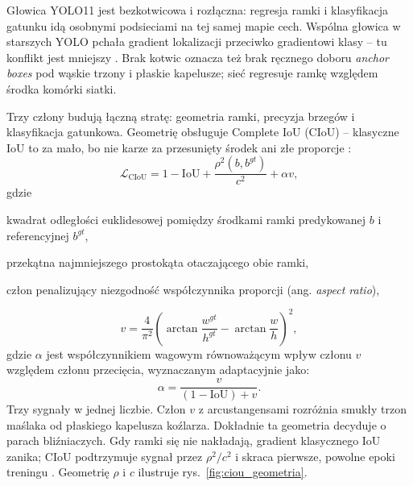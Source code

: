 Głowica YOLO11 jest bezkotwicowa i rozłączna: regresja ramki i klasyfikacja gatunku idą osobnymi podsieciami na tej samej mapie cech. Wspólna głowica w starszych YOLO pchała gradient lokalizacji przeciwko gradientowi klasy – tu konflikt jest mniejszy \cite{ultralytics2024yolo11}. Brak kotwic oznacza też brak ręcznego doboru \textit{anchor boxes} pod wąskie trzony i płaskie kapelusze; sieć regresuje ramkę względem środka komórki siatki.

Trzy człony budują łączną stratę: geometria ramki, precyzja brzegów i klasyfikacja gatunkowa. Geometrię obsługuje Complete IoU (CIoU) – klasyczne IoU to za mało, bo nie karze za przesunięty środek ani złe proporcje \cite{ultralytics2024yolo11}:
\begin{equation}
\mathcal{L}_{\mathrm{CIoU}} = 1 - \mathrm{IoU} + \frac{\rho^2(b, b^{gt})}{c^2} + \alpha v,
\end{equation}
gdzie
\begin{description}[topsep=2pt,itemsep=-3pt]
 \item[$\rho^2(b, b^{gt})$] kwadrat odległości euklidesowej pomiędzy środkami ramki predykowanej $b$ i referencyjnej $b^{gt}$,
 \item[$c$] przekątna najmniejszego prostokąta otaczającego obie ramki,
 \item[$v$] człon penalizujący niezgodność współczynnika proporcji (ang. \textit{aspect ratio}),
\end{description}
\begin{equation}
v = \frac{4}{\pi^2} \left(\arctan\frac{w^{gt}}{h^{gt}} - \arctan\frac{w}{h} \right)^2,
\end{equation}
gdzie $\alpha$ jest współczynnikiem wagowym równoważącym wpływ członu $v$ względem członu przecięcia, wyznaczanym adaptacyjnie jako:
\begin{equation}
\alpha = \frac{v}{(1-\mathrm{IoU}) + v}.
\end{equation}
Trzy sygnały w jednej liczbie. Człon $v$ z arcustangensami rozróżnia smukły trzon maślaka od płaskiego kapelusza koźlarza. Dokładnie ta geometria decyduje o parach bliźniaczych. Gdy ramki się nie nakładają, gradient klasycznego IoU zanika; CIoU podtrzymuje sygnał przez $\rho^2/c^2$ i skraca pierwsze, powolne epoki treningu \cite{ultralytics2024yolo11}. Geometrię $\rho$ i $c$ ilustruje rys.~\ref{fig:ciou_geometria}.

